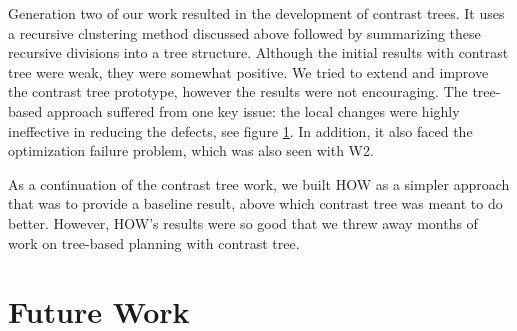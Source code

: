 \documentclass[conference]{IEEEtran}
\begin{document}
Generation two of our work resulted in the development of contrast trees. It uses a recursive clustering method discussed above followed by summarizing these recursive divisions into a tree structure. Although the initial results with contrast tree were weak, they were somewhat positive. We tried to extend and improve the contrast tree prototype, however the results were not encouraging. The tree-based approach suffered from one key issue: the local changes were highly ineffective in reducing the defects, see figure \ref{}. In addition, it also faced the optimization failure problem, which was also seen with W2. 

As a continuation of the contrast tree work, we built HOW as a simpler approach that was to provide a baseline result, above which contrast tree was meant to do better. However, HOW’s results were so good that we threw away months of work on tree-based planning with contrast tree. 
\section{Future Work}
\end{document}
